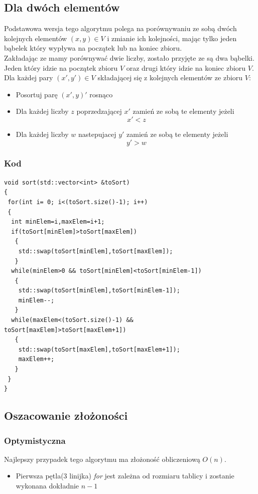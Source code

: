 \subsection*{Dla dwóch elementów}
Podstawowa wersja tego algorytmu polega na porównywaniu ze sobą dwóch kolejnych elementów $(x,y) \in V$ i zmianie ich kolejności, mając tylko jeden bąbelek który wypływa na początek lub na koniec zbioru. \\
Zakładając ze mamy porównywać dwie liczby, zostało przyjęte ze są dwa bąbelki. Jeden który idzie na początek zbioru  $V$ oraz drugi który idzie na koniec zbioru $V$. \\
Dla każdej pary $(x',y') \in V$ składającej się z kolejnych elementów ze zbioru $V$:
\begin{itemize} 
\item Posortuj parę $(x',y)'$ rosnąco
\item Dla każdej liczby $z$ poprzedzającej $x'$ zamień ze sobą te elementy jeżeli \begin{equation*}x' < z\end{equation*} 
\item  Dla każdej liczby $w$ nastepujacej $y'$ zamień ze sobą te elementy jeżeli  \begin{equation*}y'>w\end{equation*}
 \end{itemize}  

\subsubsection*{Kod}

\begin{lstlisting}[caption={Sortowanie bąbelkowe dla par},label={lst:babelek}]
void sort(std::vector<int> &toSort)
{
 for(int i= 0; i<(toSort.size()-1); i++)
 {
  int minElem=i,maxElem=i+1;
  if(toSort[minElem]>toSort[maxElem])
   {
    std::swap(toSort[minElem],toSort[maxElem]);
   }
  while(minElem>0 && toSort[minElem]<toSort[minElem-1])
   {
    std::swap(toSort[minElem],toSort[minElem-1]);
    minElem--;
   }
  while(maxElem<(toSort.size()-1) && toSort[maxElem]>toSort[maxElem+1])
   {
    std::swap(toSort[maxElem],toSort[maxElem+1]);
    maxElem++;
   } 
 }
}
\end{lstlisting}
 \subsection*{Oszacowanie złożoności}

\subsubsection*{Optymistyczna}
Najlepszy przypadek tego algorytmu ma złożoność obliczeniową $O(n)$. 
\begin{itemize}
\item Pierwsza pętla(3 linijka) \textit{for} jest zależna od rozmiaru tablicy i zostanie wykonana dokładnie $n-1$
\end{itemize}

